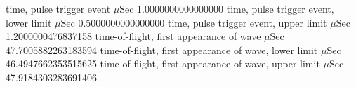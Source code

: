 \expandafter\def\csname oct2tex.water_d70_v800_P.t0.d\endcsname{time, pulse trigger event}
\expandafter\def\csname oct2tex.water_d70_v800_P.t0.u\endcsname{\ensuremath{\mu\text{Sec}}}
\expandafter\def\csname oct2tex.water_d70_v800_P.t0.v\endcsname{1.0000000000000000}
\expandafter\def\csname oct2tex.water_d70_v800_P.t0a.d\endcsname{time, pulse trigger event, lower limit}
\expandafter\def\csname oct2tex.water_d70_v800_P.t0a.u\endcsname{\ensuremath{\mu\text{Sec}}}
\expandafter\def\csname oct2tex.water_d70_v800_P.t0a.v\endcsname{0.5000000000000000}
\expandafter\def\csname oct2tex.water_d70_v800_P.t0b.d\endcsname{time, pulse trigger event, upper limit}
\expandafter\def\csname oct2tex.water_d70_v800_P.t0b.u\endcsname{\ensuremath{\mu\text{Sec}}}
\expandafter\def\csname oct2tex.water_d70_v800_P.t0b.v\endcsname{1.2000000476837158}
\expandafter\def\csname oct2tex.water_d70_v800_P.t1.d\endcsname{time-of-flight, first appearance of wave}
\expandafter\def\csname oct2tex.water_d70_v800_P.t1.u\endcsname{\ensuremath{\mu\text{Sec}}}
\expandafter\def\csname oct2tex.water_d70_v800_P.t1.v\endcsname{47.7005882263183594}
\expandafter\def\csname oct2tex.water_d70_v800_P.t1a.d\endcsname{time-of-flight, first appearance of wave, lower limit}
\expandafter\def\csname oct2tex.water_d70_v800_P.t1a.u\endcsname{\ensuremath{\mu\text{Sec}}}
\expandafter\def\csname oct2tex.water_d70_v800_P.t1a.v\endcsname{46.4947662353515625}
\expandafter\def\csname oct2tex.water_d70_v800_P.t1b.d\endcsname{time-of-flight, first appearance of wave, upper limit}
\expandafter\def\csname oct2tex.water_d70_v800_P.t1b.u\endcsname{\ensuremath{\mu\text{Sec}}}
\expandafter\def\csname oct2tex.water_d70_v800_P.t1b.v\endcsname{47.9184303283691406}
